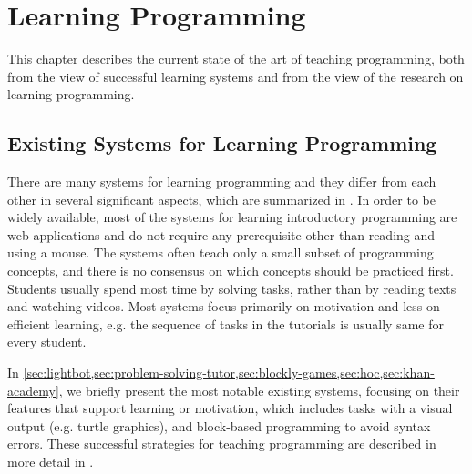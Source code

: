 \chapter{Learning Programming}
\label{chap:learning-programming}


This chapter describes the current state of the art of teaching programming, both from the view of successful learning systems and from the view of the research on learning programming.

\section{Existing Systems for Learning Programming}
\label{sec:existing-systems}

There are many systems for learning programming and they differ from each other
in several significant aspects, which are summarized in .
In order to be widely available, most of the systems for learning introductory programming
are web applications and do not require any prerequisite other than reading
and using a mouse.
The systems %
often teach only a small subset of programming concepts,
and there is no consensus on which concepts should be practiced first. %
Students usually spend most time by solving tasks, rather than
by reading texts and watching videos.
Most systems focus primarily on motivation and less on efficient learning,
e.g. the sequence of tasks in the tutorials is usually same for every student.

In \cref{sec:lightbot,sec:problem-solving-tutor,sec:blockly-games,sec:hoc,sec:khan-academy},
we briefly present the most notable existing systems,
focusing on their features that support learning or motivation,
which includes tasks with a visual output (e.g. turtle graphics),
and block-based programming to avoid syntax errors.
These successful strategies for teaching programming are described in
more detail in .

